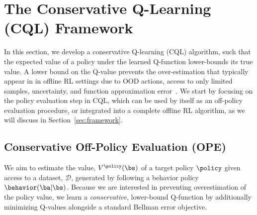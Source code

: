 \vspace{-5pt}
\section{The Conservative Q-Learning (CQL) Framework}
\vspace{-5pt}
In this section, we develop a conservative Q-learning (CQL) algorithm, such that the expected value of a policy under the learned Q-function lower-bounds its true value. A lower bound on the Q-value prevents the over-estimation that typically appear in in offline RL settings due to OOD actions, access to only limited samples, uncertainty, and function approximation error~\citep{levine2020offline,kumar2019stabilizing}. 
We start by focusing on the policy evaluation step in CQL, which can be used by itself as an off-policy evaluation procedure, or integrated into a complete offline RL algorithm, as we will discuss in Section~\ref{sec:framework}.

\subsection{Conservative Off-Policy Evaluation (OPE)}
\label{sec:policy_eval}
\vspace{-5pt}
We aim to estimate the value, $V^\policy(\bs)$ of a target policy $\policy$ given access to a dataset, $\mathcal{D}$, generated by following a behavior policy $\behavior(\ba|\bs)$.
Because we are interested in preventing overestimation of the policy value, we learn a \textit{conservative}, lower-bound Q-function by additionally minimizing Q-values alongside a standard Bellman error objective. 

